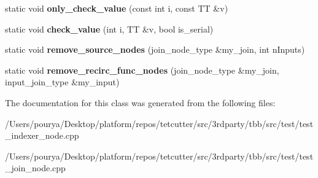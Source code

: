 \begin{DoxyCompactItemize}
\item 
\hypertarget{classsource__node__helper_a758219d3f7ec5b824b994cfc9aca4047}{}static void {\bfseries only\+\_\+check\+\_\+value} (const int i, const T\+T \&v)\label{classsource__node__helper_a758219d3f7ec5b824b994cfc9aca4047}

\item 
\hypertarget{classsource__node__helper_ab74d5cc0a3d9566a8905b8d4a399f359}{}static void {\bfseries check\+\_\+value} (int i, T\+T \&v, bool is\+\_\+serial)\label{classsource__node__helper_ab74d5cc0a3d9566a8905b8d4a399f359}

\item 
\hypertarget{classsource__node__helper_af9702b87100a7cd871ed7bb168496872}{}static void {\bfseries remove\+\_\+source\+\_\+nodes} (join\+\_\+node\+\_\+type \&my\+\_\+join, int n\+Inputs)\label{classsource__node__helper_af9702b87100a7cd871ed7bb168496872}

\item 
\hypertarget{classsource__node__helper_a5c6c003aabd2d1ff5ee11eead8c68846}{}static void {\bfseries remove\+\_\+recirc\+\_\+func\+\_\+nodes} (join\+\_\+node\+\_\+type \&my\+\_\+join, input\+\_\+join\+\_\+type \&my\+\_\+input)\label{classsource__node__helper_a5c6c003aabd2d1ff5ee11eead8c68846}

\end{DoxyCompactItemize}


The documentation for this class was generated from the following files\+:\begin{DoxyCompactItemize}
\item 
/\+Users/pourya/\+Desktop/platform/repos/tetcutter/src/3rdparty/tbb/src/test/test\+\_\+indexer\+\_\+node.\+cpp\item 
/\+Users/pourya/\+Desktop/platform/repos/tetcutter/src/3rdparty/tbb/src/test/test\+\_\+join\+\_\+node.\+cpp\end{DoxyCompactItemize}
